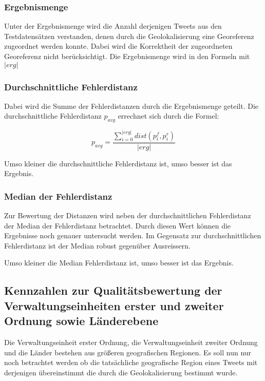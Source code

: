 			\subsubsection{Ergebnismenge}

				Unter der Ergebnismenge wird die Anzahl derjenigen Tweets aus den Testdatensätzen verstanden, denen durch die Geolokalisierung eine Georeferenz zugeordnet werden konnte.
				Dabei wird die Korrektheit der zugeordneten Georeferenz nicht berücksichtigt.
				Die Ergebnismenge wird in den Formeln mit $|erg|$

			\subsubsection{Durchschnittliche Fehlerdistanz} 

				Dabei wird die Summe der Fehlerdistanzen durch die Ergebnismenge geteilt.
				Die durchschnittliche Fehlerdistanz $p_{avg}$ errechnet sich durch die Formel:

				\begin{equation}
					p_{avg}=\frac{\sum_{i=0}^{|erg|}{dist(p^f_i,p^r_i)}}{|erg|}
				\end{equation}	

				Umso kleiner die durchschnittliche Fehlerdistanz ist, umso besser ist das Ergebnis.

			\subsubsection{Median der Fehlerdistanz}

				Zur Bewertung der Distanzen wird neben der durchschnittlichen Fehlerdistanz der Median der Fehlerdistanz betrachtet.
				Durch diesen Wert können die Ergebnisse noch genauer untersucht werden. 
				Im Gegensatz zur durchschnittlichen Fehlerdistanz ist der Median robust gegenüber Ausreissern.

				Umso kleiner die Median Fehlerdistanz ist, umso besser ist das Ergebnis.

		\subsection{Kennzahlen zur Qualitätsbewertung der Verwaltungseinheiten erster und zweiter Ordnung sowie Länderebene} 

			Die Verwaltungseinheit erster Ordnung, die Verwaltungseinheit zweiter Ordnung und die Länder bestehen aus größeren geografischen Regionen.
			Es soll nun nur noch betrachtet werden ob die tatsächliche geografische Region eines Tweets mit derjenigen übereinstimmt die durch die Geolokalisierung bestimmt wurde.
			
